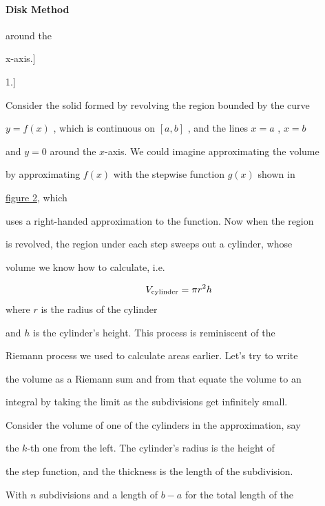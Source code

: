 \paragraph{Disk Method}




around the

x-axis.]




1.]



Consider the solid formed by revolving the region bounded by the curve

$y=f(x)$ , which is continuous on $[a,b]$ , and the lines $x=a$ , $x=b$

and $y=0$ around the $x$-axis. We could imagine approximating the volume

by approximating $f(x)$ with the stepwise function $g(x)$ shown in

\href{:File:Approx _generating_fx _disk_method.svg "wikilink"}{figure 2}, which

uses a right-handed approximation to the function. Now when the region

is revolved, the region under each step sweeps out a cylinder, whose

volume we know how to calculate, i.e.



$$V _{\rm cylinder}=\pi r^2 h$$ where $r$ is the radius of the cylinder

and $h$ is the cylinder's height. This process is reminiscent of the

Riemann process we used to calculate areas earlier. Let's try to write

the volume as a Riemann sum and from that equate the volume to an

integral by taking the limit as the subdivisions get infinitely small.



Consider the volume of one of the cylinders in the approximation, say

the $k$-th one from the left. The cylinder's radius is the height of

the step function, and the thickness is the length of the subdivision.

With $n$ subdivisions and a length of $b-a$ for the total length of the

